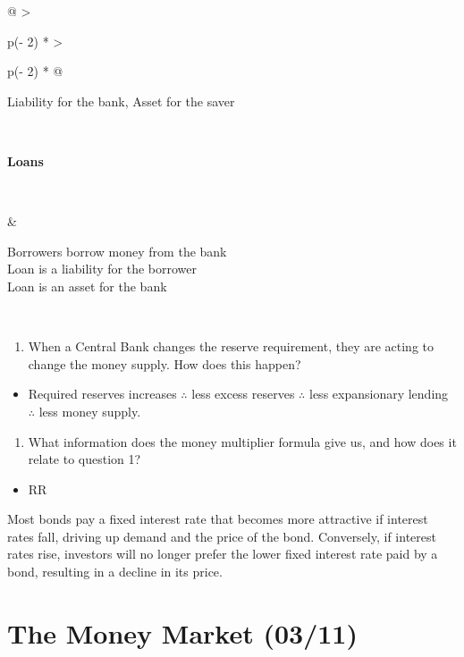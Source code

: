 \documentclass[
  letterpaper,
  DIV=11,
  numbers=noendperiod]{scrartcl}
\providecommand{\tightlist}{%
  \setlength{\itemsep}{0pt}\setlength{\parskip}{0pt}}\usepackage{longtable,booktabs,array}
\begin{document}
\begin{longtable}[]{@{}
  >{\raggedright\arraybackslash}p{(\columnwidth - 2\tabcolsep) * }
  >{\raggedright\arraybackslash}p{(\columnwidth - 2\tabcolsep) * }@{}}
\begin{minipage}[t]{\linewidth}
Liability for the bank, Asset for the saver\strut
\end{minipage} \\
\begin{minipage}[t]{\linewidth}\raggedright
\textbf{Loans}\\
\strut \\
\strut
\end{minipage} & \begin{minipage}[t]{\linewidth}\raggedright
Borrowers borrow money from the bank\\
Loan is a liability for the borrower\\
Loan is an asset for the bank\strut
\end{minipage} \\
\end{longtable}

\begin{enumerate}
\def\labelenumi{\arabic{enumi}.}
\tightlist
\item
  When a Central Bank changes the reserve requirement, they are acting
  to change the money supply. How does this happen?
\end{enumerate}

\begin{itemize}
\tightlist
\item
  Required reserves increases \(\therefore\) less excess reserves
  \(\therefore\) less expansionary lending \(\therefore\) less money
  supply.
\end{itemize}

\begin{enumerate}
\def\labelenumi{\arabic{enumi}.}
\setcounter{enumi}{1}
\tightlist
\item
  What information does the money multiplier formula give us, and how
  does it relate to question 1?
\end{enumerate}

\begin{itemize}
\tightlist
\item
  RR
\end{itemize}

Most bonds pay a fixed interest rate that becomes more attractive if
interest rates fall, driving up demand and the price of the bond.
Conversely, if interest rates rise, investors will no longer prefer the
lower fixed interest rate paid by a bond, resulting in a decline in its
price.

\section{The Money Market (03/11)}\label{the-money-market-0311}
\end{document}
